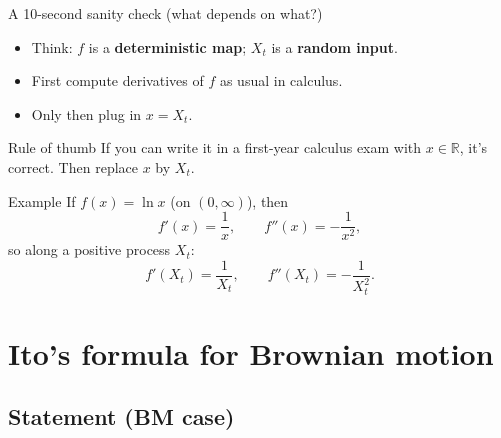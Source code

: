 \documentclass[10pt,aspectratio=169]{beamer}
\newcommand{\R}{\mathbb{R}}
\begin{document}
\begin{frame}{A 10-second sanity check (what depends on what?)}

\begin{itemize}
  \item Think: $f$ is a \textbf{deterministic map}; $X_t$ is a \textbf{random input}.\pause
  \item First compute derivatives of $f$ as usual in calculus.\pause
  \item Only then plug in $x=X_t$.\pause
\end{itemize}

\medskip
\begin{alertblock}{Rule of thumb}
If you can write it in a first-year calculus exam with $x\in\R$, it's correct.
Then replace $x$ by $X_t$.
\end{alertblock}\pause

\begin{block}{Example}
If $f(x)=\ln x$ (on $(0,\infty)$), then
\[
f'(x)=\frac{1}{x},\qquad f''(x)=-\frac{1}{x^2},
\]
so along a positive process $X_t$:
\[
f'(X_t)=\frac{1}{X_t},\qquad f''(X_t)=-\frac{1}{X_t^2}.
\]
\end{block}

\end{frame}

\section{Ito's formula for Brownian motion}

\subsection{Statement (BM case)}
\end{document}
